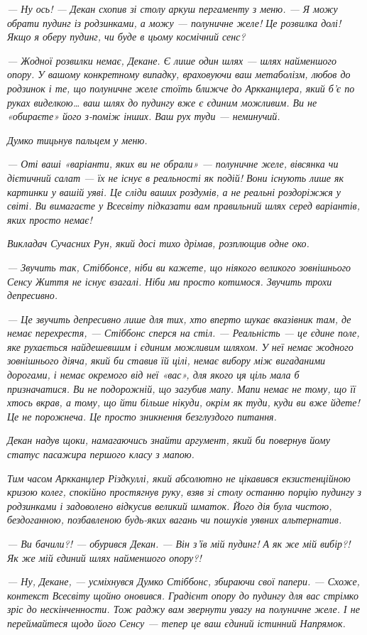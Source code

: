 \documentclass[12pt, a4paper, openany]{book}
\begin{document}
\begin{terrybox}
\textit{--- Ну ось! --- Декан схопив зі столу аркуш пергаменту з меню. --- Я можу обрати пудинг із родзинками, а можу --- полуничне желе! Це розвилка долі! Якщо я оберу пудинг, чи буде в цьому космічний сенс?}

\textit{--- Жодної розвилки немає, Декане. Є лише один шлях --- шлях найменшого опору. У вашому конкретному випадку, враховуючи ваш метаболізм, любов до родзинок і те, що полуничне желе стоїть ближче до Аркканцлера, який б'є по руках виделкою\ldots{} ваш шлях до пудингу вже є єдиним можливим. Ви не «обираєте» його з-поміж інших. Ваш рух туди --- неминучий.}

\textit{Думко тицьнув пальцем у меню.}

\textit{--- Оті ваші «варіанти, яких ви не обрали» --- полуничне желе, вівсянка чи дієтичний салат --- їх не існує в реальності як подій! Вони існують лише як картинки у вашій уяві. Це сліди ваших роздумів, а не реальні роздоріжжя у світі. Ви вимагаєте у Всесвіту підказати вам правильний шлях серед варіантів, яких просто немає!}

\textit{Викладач Сучасних Рун, який досі тихо дрімав, розплющив одне око.}

\textit{--- Звучить так, Стіббонсе, ніби ви кажете, що ніякого великого зовнішнього Сенсу Життя не існує взагалі. Ніби ми просто котимося. Звучить трохи депресивно.}

\textit{--- Це звучить депресивно лише для тих, хто вперто шукає вказівник там, де немає перехрестя, --- Стіббонс сперся на стіл. --- Реальність --- це єдине поле, яке рухається найдешевшим і єдиним можливим шляхом. У неї немає жодного зовнішнього діяча, який би ставив їй цілі, немає вибору між вигаданими дорогами, і немає окремого від неї «вас», для якого ця ціль мала б призначатися. Ви не подорожній, що загубив мапу. Мапи немає не тому, що її хтось вкрав, а тому, що йти більше нікуди, окрім як туди, куди ви вже йдете! Це не порожнеча. Це просто зникнення безглуздого питання.}

\textit{Декан надув щоки, намагаючись знайти аргумент, який би повернув йому статус пасажира першого класу з мапою.}

\textit{Тим часом Аркканцлер Різдкуллі, який абсолютно не цікавився екзистенційною кризою колег, спокійно простягнув руку, взяв зі столу останню порцію пудингу з родзинками і задоволено відкусив великий шматок. Його дія була чистою, бездоганною, позбавленою будь-яких вагань чи пошуків уявних альтернатив.}

\textit{--- Ви бачили?! --- обурився Декан. --- Він з'їв мій пудинг! А як же мій вибір?! Як же мій єдиний шлях найменшого опору?!}

\textit{--- Ну, Декане, --- усміхнувся Думко Стіббонс, збираючи свої папери. --- Схоже, контекст Всесвіту щойно оновився. Градієнт опору до пудингу для вас стрімко зріс до нескінченности. Тож раджу вам звернути увагу на полуничне желе. І не переймайтеся щодо його Сенсу --- тепер це ваш єдиний істинний Напрямок.}
\end{terrybox}
\end{document}
